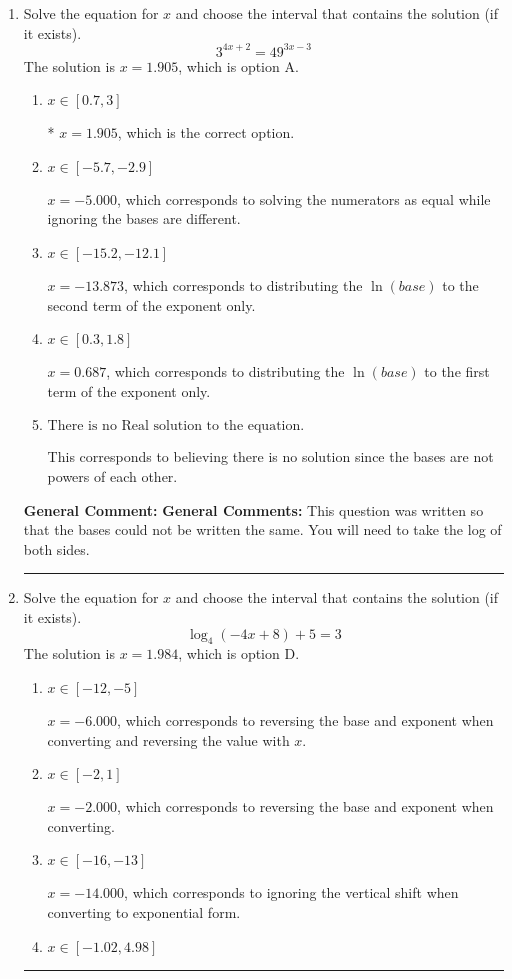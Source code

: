\documentclass{extbook}[14pt]
\newcommand{\litem}[1]{\item #1

\rule{\textwidth}{0.4pt}}
\begin{document}
\begin{enumerate}\litem{
Solve the equation for $x$ and choose the interval that contains the solution (if it exists).
\[ 3^{4x+2} = 49^{3x-3} \]The solution is \( x = 1.905 \), which is option A.\begin{enumerate}[label=\Alph*.]
\item \( x \in [0.7, 3] \)

* $x = 1.905$, which is the correct option.
\item \( x \in [-5.7, -2.9] \)

$x = -5.000$, which corresponds to solving the numerators as equal while ignoring the bases are different.
\item \( x \in [-15.2, -12.1] \)

$x = -13.873$, which corresponds to distributing the $\ln(base)$ to the second term of the exponent only.
\item \( x \in [0.3, 1.8] \)

$x = 0.687$, which corresponds to distributing the $\ln(base)$ to the first term of the exponent only.
\item \( \text{There is no Real solution to the equation.} \)

This corresponds to believing there is no solution since the bases are not powers of each other.
\end{enumerate}

\textbf{General Comment:} \textbf{General Comments:} This question was written so that the bases could not be written the same. You will need to take the log of both sides.
}
\litem{
Solve the equation for $x$ and choose the interval that contains the solution (if it exists).
\[ \log_{4}{(-4x+8)}+5 = 3 \]The solution is \( x = 1.984 \), which is option D.\begin{enumerate}[label=\Alph*.]
\item \( x \in [-12, -5] \)

$x = -6.000$, which corresponds to reversing the base and exponent when converting and reversing the value with $x$.
\item \( x \in [-2, 1] \)

$x = -2.000$, which corresponds to reversing the base and exponent when converting.
\item \( x \in [-16, -13] \)

$x = -14.000$, which corresponds to ignoring the vertical shift when converting to exponential form.
\item \( x \in [-1.02, 4.98] \)


\end{enumerate}}
\end{enumerate}
\end{document}
